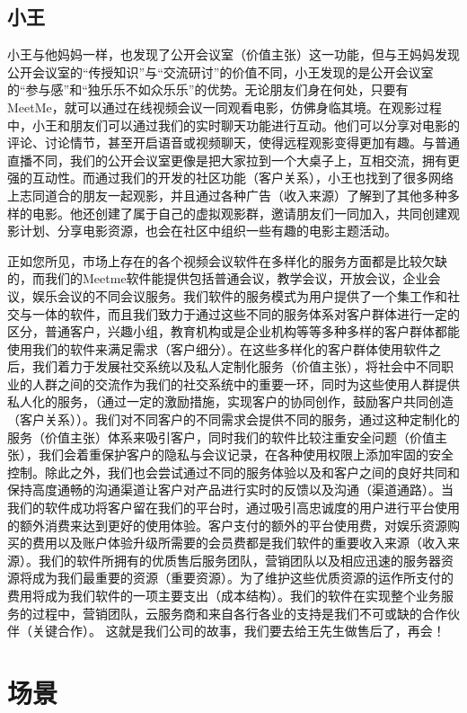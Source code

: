 \documentclass[a4paper,12pt]{article}
\begin{document}
    \subsection{小王}
    \noindent 小王与他妈妈一样，也发现了公开会议室（价值主张）这一功能，但与王妈妈发现公开会议室的“传授知识”与“交流研讨”的价值不同，小王发现的是公开会议室的“参与感”和“独乐乐不如众乐乐”的优势。无论朋友们身在何处，只要有 MeetMe，就可以通过在线视频会议一同观看电影，仿佛身临其境。在观影过程中，小王和朋友们可以通过我们的实时聊天功能进行互动。他们可以分享对电影的评论、讨论情节，甚至开启语音或视频聊天，使得远程观影变得更加有趣。与普通直播不同，我们的公开会议室更像是把大家拉到一个大桌子上，互相交流，拥有更强的互动性。而通过我们的开发的社区功能（客户关系），小王也找到了很多网络上志同道合的朋友一起观影，并且通过各种广告（收入来源）了解到了其他多种多样的电影。他还创建了属于自己的虚拟观影群，邀请朋友们一同加入，共同创建观影计划、分享电影资源，也会在社区中组织一些有趣的电影主题活动。
    
    \vspace{1em}
    
    \noindent 正如您所见，市场上存在的各个视频会议软件在多样化的服务方面都是比较欠缺的，而我们的Meetme软件能提供包括普通会议，教学会议，开放会议，企业会议，娱乐会议的不同会议服务。我们软件的服务模式为用户提供了一个集工作和社交与一体的软件，而且我们致力于通过这些不同的服务体系对客户群体进行一定的区分，普通客户，兴趣小组，教育机构或是企业机构等等多种多样的客户群体都能使用我们的软件来满足需求（客户细分）。在这些多样化的客户群体使用软件之后，我们着力于发展社交系统以及私人定制化服务（价值主张），将社会中不同职业的人群之间的交流作为我们的社交系统中的重要一环，同时为这些使用人群提供私人化的服务，（通过一定的激励措施，实现客户的协同创作，鼓励客户共同创造（客户关系））。我们对不同客户的不同需求会提供不同的服务，通过这种定制化的服务（价值主张）体系来吸引客户，同时我们的软件比较注重安全问题（价值主张），我们会着重保护客户的隐私与会议记录，在各种使用权限上添加牢固的安全控制。除此之外，我们也会尝试通过不同的服务体验以及和客户之间的良好共同和保持高度通畅的沟通渠道让客户对产品进行实时的反馈以及沟通（渠道通路）。当我们的软件成功将客户留在我们的平台时，通过吸引高忠诚度的用户进行平台使用的额外消费来达到更好的使用体验。客户支付的额外的平台使用费，对娱乐资源购买的费用以及账户体验升级所需要的会员费都是我们软件的重要收入来源（收入来源）。我们的软件所拥有的优质售后服务团队，营销团队以及相应迅速的服务器资源将成为我们最重要的资源（重要资源）。为了维护这些优质资源的运作所支付的费用将成为我们软件的一项主要支出（成本结构）。我们的软件在实现整个业务服务的过程中，营销团队，云服务商和来自各行各业的支持是我们不可或缺的合作伙伴（关键合作）。
    这就是我们公司的故事，我们要去给王先生做售后了，再会！
    \section{场景}
\end{document}

